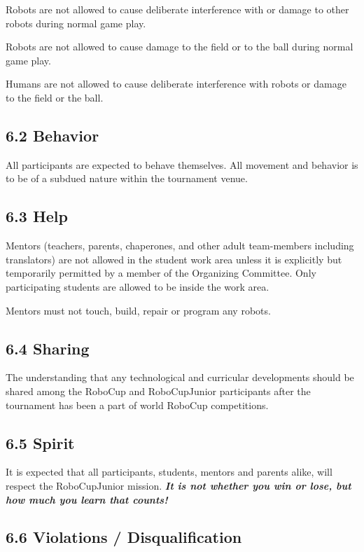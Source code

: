 \documentclass{article}
\begin{document}
Robots are not allowed to cause deliberate interference with or damage to other robots during normal game play. 

Robots are not allowed to cause damage to the field or to the ball during normal game play. 

Humans are not allowed to cause deliberate interference with robots or damage to the field or the ball. 

\subsection{6.2 Behavior \label{ref-042}}

All participants are expected to behave themselves. All movement and behavior is to be of a subdued nature within the tournament venue. 

\subsection{6.3 Help \label{ref-043}}

Mentors (teachers, parents, chaperones, and other adult team-members including translators) are not allowed in the student work area unless it is explicitly but temporarily permitted by a member of the Organizing Committee. Only participating students are allowed to be inside the work area. 

Mentors must not touch, build, repair or program any robots. 

\subsection{6.4 Sharing \label{ref-044}}

The understanding that any technological and curricular developments should be shared among the RoboCup and RoboCupJunior participants after the tournament has been a part of world RoboCup competitions. 

\subsection{6.5 Spirit \label{ref-045}}

It is expected that all participants, students, mentors and parents alike, will respect the RoboCupJunior mission. \textbf{\textit{It is not whether you win or lose, but how much you learn that counts!}} 

\subsection{6.6 Violations / Disqualification \label{ref-046}}
\end{document}

